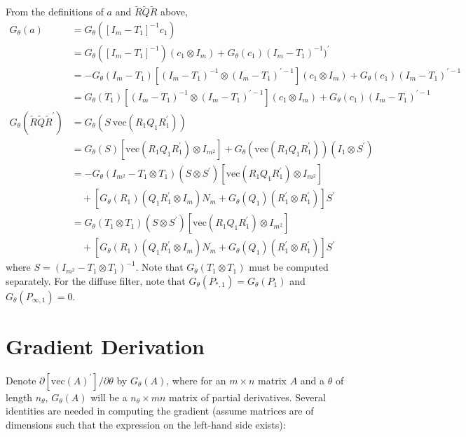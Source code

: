 \documentclass[12pt]{article}
\newcommand{\Gt}{G_\theta}
\newcommand{\vecop}[0]{\text{vec}}
\begin{document}
	From the definitions of $a$ and $\tilde{R} \tilde{Q} \tilde{R}$ above, 
	\begin{align*}
	\Gt(a) &= \Gt([I_m - T_1]^{-1} c_1) \\ 
		&= \Gt([I_m - T_1]^{-1}) (c_1 \otimes I_m) + \Gt(c_1) (I_m - T_1)^{-1})^\prime \\ 
		&= -\Gt(I_m - T_1) [(I_m - T_1)^{-1} \otimes (I_m - T_1)^{\prime-1} ](c_1 \otimes I_m) +  \Gt(c_1) (I_m - T_1)^{\prime-1} \\ 
		&= \Gt(T_1) [(I_m - T_1)^{-1} \otimes (I_m - T_1)^{\prime-1}] (c_1 \otimes I_m) +  \Gt(c_1) (I_m - T_1)^{\prime-1} \\
	\Gt(\tilde{R} \tilde{Q} \tilde{R}^\prime) &= \Gt(S \ \vecop(R_1 Q_1 R_1^\prime))\\
		&= \Gt(S) [\vecop(R_1 Q_1 R_1^\prime) \otimes I_{m^2}] + \Gt(\vecop(R_1 Q_1 R_1^\prime))(I_1 \otimes S^\prime) \\
		&= -\Gt(I_{m^2} - T_1 \otimes T_1)(S \otimes S^\prime) [\vecop(R_1 Q_1 R_1^\prime) \otimes I_{m^2}]\\ 
		&\quad + [\Gt(R_1)(Q_1 R_1^\prime \otimes I_m) N_m + \Gt(Q_1)(R_1^\prime \otimes R_1^\prime)] S^\prime \\
		&= \Gt(T_1 \otimes T_1)(S \otimes S^\prime) [\vecop(R_1 Q_1 R_1^\prime) \otimes I_{m^2}] \\
		&\quad + [\Gt(R_1)(Q_1 R_1^\prime \otimes I_m) N_m + \Gt(Q_1)(R_1^\prime \otimes R_1^\prime)] S^\prime
	\end{align*}
	where $S = (I_{m^2} - T_1 \otimes T_1)^{-1}$. Note that $\Gt(T_1 \otimes T_1)$ must be computed separately. For the diffuse filter, note that $\Gt(P_{*,1}) = \Gt(P_1)$ and $\Gt(P_{\infty,1}) = 0$.

\appendix
\section{Gradient Derivation} \label{sec:gradient_derivation}
	Denote $\partial \left[ \vecop(A)^\prime \right] / \partial \theta$ by $\Gt(A)$, where for an $m \times n$ matrix $A$ and a $\theta$ of length $n_\theta$, $\Gt(A)$ will be a $n_\theta \times mn$ matrix of partial derivatives. Several identities are needed in computing the gradient (assume matrices are of dimensions such that the expression on the left-hand side exists):
\end{document}

